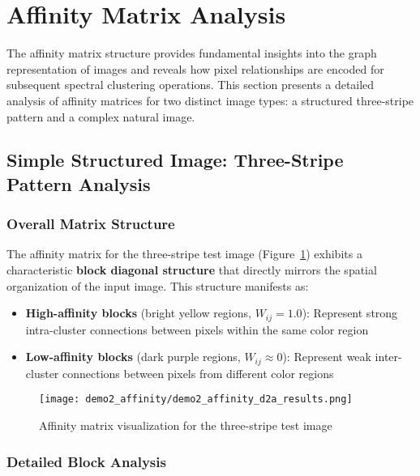 \documentclass[12pt,a4paper]{article}
\begin{document}
{\section{Affinity Matrix Analysis}

The affinity matrix structure provides fundamental insights into the graph representation of images and reveals how pixel relationships are encoded for subsequent spectral clustering operations. This section presents a detailed analysis of affinity matrices for two distinct image types: a structured three-stripe pattern and a complex natural image.

\subsection{Simple Structured Image: Three-Stripe Pattern Analysis}


\subsubsection{Overall Matrix Structure}

The affinity matrix for the three-stripe test image (Figure~\ref{fig:affinity_matrix}) exhibits a characteristic \textbf{block diagonal structure} that directly mirrors the spatial organization of the input image. This structure manifests as:

\begin{itemize}
    \item \textbf{High-affinity blocks} (bright yellow regions, $W_{ij} = 1.0$): Represent strong intra-cluster connections between pixels within the same color region
    \item \textbf{Low-affinity blocks} (dark purple regions, $W_{ij} \approx 0$): Represent weak inter-cluster connections between pixels from different color regions
\end{itemize}


\begin{figure}[H]
    \centering
    \texttt{[image: demo2\_affinity/demo2\_affinity\_d2a\_results.png]}
    \caption{Affinity matrix visualization for the three-stripe test image}
    \label{fig:affinity_matrix}
\end{figure}



\subsubsection{Detailed Block Analysis}

}
\end{document}
